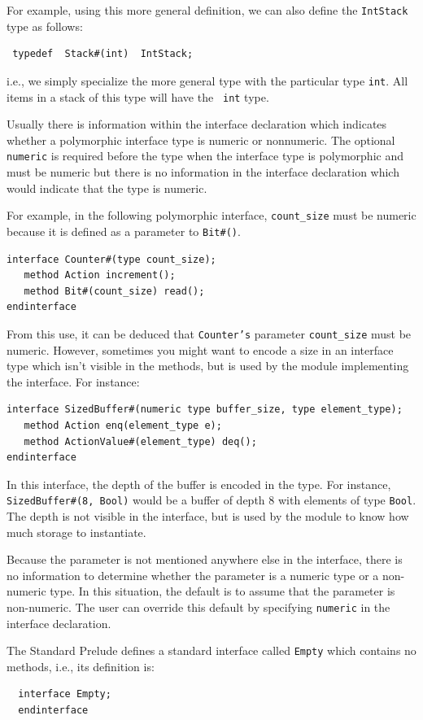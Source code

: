 \documentclass[twoside,letterpaper]{article}
\newcommand{\te}[1]{\texttt{#1}}
\begin{document}
For example, using this more general definition, we can also define
the \texttt{IntStack} type as follows:
\begin{verbatim}
 typedef  Stack#(int)  IntStack;
\end{verbatim}
i.e., we simply specialize the more general type with the particular
type \texttt{int}.  All items in a stack of this type will have the {\tt
int} type.

Usually there is information within the interface declaration which
indicates whether a polymorphic interface type is numeric or
nonnumeric.  The optional \te{numeric} is required before the type when the
interface type is polymorphic and must be numeric but there is no
information in the interface declaration which would indicate that the
type is numeric.

For example, in the following polymorphic interface, \te{count\_size}
must be numeric because it is defined as a parameter to \te{Bit\#()}.
\begin{verbatim}
interface Counter#(type count_size);
   method Action increment();
   method Bit#(count_size) read();
endinterface
\end{verbatim}
From this use, it can be deduced that
\te{Counter's} parameter \te{count\_size} must be numeric.  However, sometimes
you might want to encode a size in an interface type which isn't
visible in the methods, but is used by the module implementing the
interface.   For instance:
\begin{verbatim}
interface SizedBuffer#(numeric type buffer_size, type element_type);
   method Action enq(element_type e);
   method ActionValue#(element_type) deq();
endinterface
\end{verbatim}
In this interface, the depth of the buffer is encoded in the type.
For instance, \te{SizedBuffer\#(8, Bool)} would be a buffer of depth 8 with
elements of type \te{Bool}.  The depth is not visible in the interface, but
is used by the module to know how much storage to instantiate.

Because the parameter is not mentioned anywhere else in the interface,
there is no information to determine whether the parameter is a
numeric type or a non-numeric type.  In this situation, the default is
to assume that the parameter is non-numeric.  The user can override
this default by specifying \te{numeric} in the interface declaration. 

The Standard Prelude defines a standard interface called
\te{Empty}\index{Empty@\te{Empty} (interface)} 
which contains no methods, i.e., its definition is: 
\begin{verbatim}
  interface Empty;
  endinterface
\end{verbatim}
\end{document}
